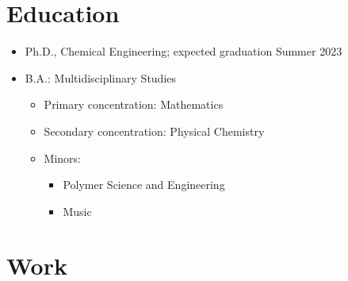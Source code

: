 \documentclass{my_cv}
\begin{document}

\section{Education}
\begin{itemize}
    \item Ph.D., Chemical Engineering; expected graduation Summer 2023
\end{itemize}
\begin{itemize}
    \item B.A.: Multidisciplinary Studies
    \begin{itemize}
        \item Primary concentration: Mathematics
        \item Secondary concentration: Physical Chemistry
    \item Minors:
    \begin{itemize}
        \item Polymer Science and Engineering
        \item Music
    \end{itemize}
    \end{itemize}
\end{itemize}

\section{Work}
\end{document}
